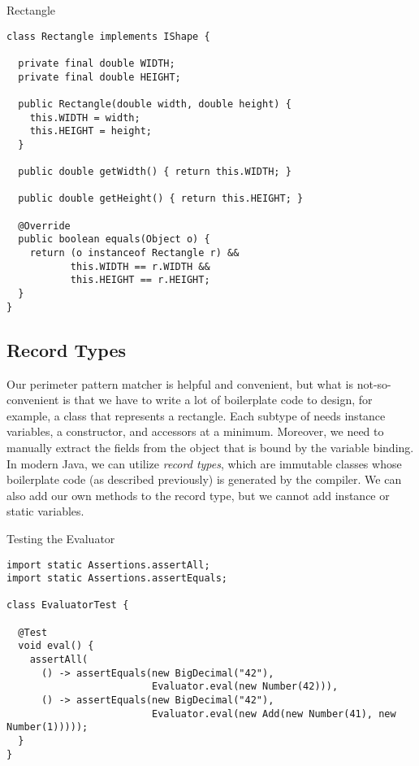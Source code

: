 \begin{cl}{Rectangle}
\begin{lstlisting}[language=MyJava]
class Rectangle implements IShape {

  private final double WIDTH;
  private final double HEIGHT;

  public Rectangle(double width, double height) {
    this.WIDTH = width;
    this.HEIGHT = height;
  }

  public double getWidth() { return this.WIDTH; }

  public double getHeight() { return this.HEIGHT; }

  @Override
  public boolean equals(Object o) {
    return (o instanceof Rectangle r) &&
           this.WIDTH == r.WIDTH &&
           this.HEIGHT == r.HEIGHT;
  }
}
\end{lstlisting}
\end{cl}


\subsection*{Record Types}

Our perimeter pattern matcher is helpful and convenient, but what is not-so-convenient is that we have to write a lot of boilerplate code to design, for example, a class that represents a rectangle. Each subtype of  needs instance variables, a constructor, and accessors at a minimum. Moreover, we need to manually extract the fields from the object that is bound by the variable binding. In modern Java, we can utilize \textit{record types}, which are immutable classes whose boilerplate code (as described previously) is generated by the compiler. We can also add our own methods to the record type, but we cannot add instance or static variables.


\begin{cl}{Testing the Evaluator}
\begin{lstlisting}[language=MyJava]
import static Assertions.assertAll;
import static Assertions.assertEquals;

class EvaluatorTest {

  @Test
  void eval() {
    assertAll(
      () -> assertEquals(new BigDecimal("42"),
                         Evaluator.eval(new Number(42))),
      () -> assertEquals(new BigDecimal("42"),
                         Evaluator.eval(new Add(new Number(41), new Number(1)))));
  }
}
\end{lstlisting}
\end{cl}

